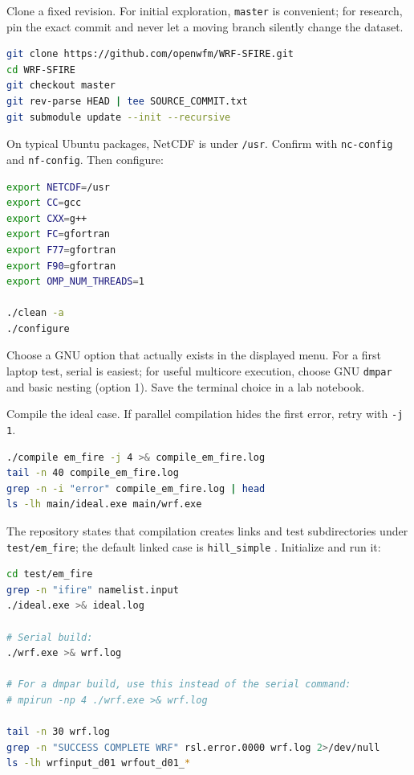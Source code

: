\documentclass[11pt]{article}
\begin{document}
Clone a fixed revision. For initial exploration, \texttt{master} is convenient; for research, pin the exact commit and never let a moving branch silently change the dataset.

\begin{lstlisting}[language=bash,caption={Clone and record provenance}]
git clone https://github.com/openwfm/WRF-SFIRE.git
cd WRF-SFIRE
git checkout master
git rev-parse HEAD | tee SOURCE_COMMIT.txt
git submodule update --init --recursive
\end{lstlisting}

On typical Ubuntu packages, NetCDF is under \texttt{/usr}. Confirm with \texttt{nc-config} and \texttt{nf-config}. Then configure:

\begin{lstlisting}[language=bash,caption={Configure WRF-SFIRE}]
export NETCDF=/usr
export CC=gcc
export CXX=g++
export FC=gfortran
export F77=gfortran
export F90=gfortran
export OMP_NUM_THREADS=1

./clean -a
./configure
\end{lstlisting}

Choose a GNU option that actually exists in the displayed menu. For a first laptop test, serial is easiest; for useful multicore execution, choose GNU \texttt{dmpar} and basic nesting (option 1). Save the terminal choice in a lab notebook.

Compile the ideal case. If parallel compilation hides the first error, retry with \texttt{-j 1}.

\begin{lstlisting}[language=bash,caption={Compile and verify}]
./compile em_fire -j 4 >& compile_em_fire.log
tail -n 40 compile_em_fire.log
grep -n -i "error" compile_em_fire.log | head
ls -lh main/ideal.exe main/wrf.exe
\end{lstlisting}

The repository states that compilation creates links and test subdirectories under \texttt{test/em\_fire}; the default linked case is \texttt{hill\_simple} \cite{emFireReadme}. Initialize and run it:

\begin{lstlisting}[language=bash,caption={Run the idealized hill case}]
cd test/em_fire
grep -n "ifire" namelist.input
./ideal.exe >& ideal.log

# Serial build:
./wrf.exe >& wrf.log

# For a dmpar build, use this instead of the serial command:
# mpirun -np 4 ./wrf.exe >& wrf.log

tail -n 30 wrf.log
grep -n "SUCCESS COMPLETE WRF" rsl.error.0000 wrf.log 2>/dev/null
ls -lh wrfinput_d01 wrfout_d01_*
\end{lstlisting}
\end{document}
